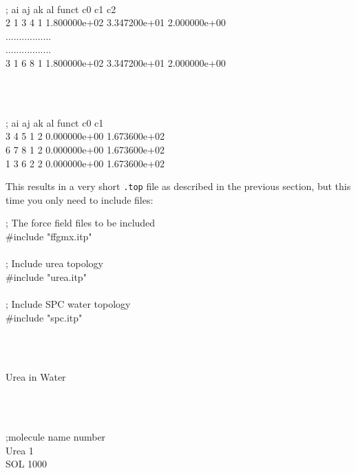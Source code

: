 \begin{tt}
[ dihedrals ]\\
;  ai    aj    ak    al funct           c0           c1           c2\\
    2     1     3     4     1 1.800000e+02 3.347200e+01 2.000000e+00 \\
     .................\\
     .................\\
    3     1     6     8     1 1.800000e+02 3.347200e+01 2.000000e+00 \\
\end{tt}\\
\begin{tt}
[ dihedrals ]\\
;  ai    aj    ak    al funct           c0           c1\\
    3     4     5     1     2 0.000000e+00 1.673600e+02 \\
    6     7     8     1     2 0.000000e+00 1.673600e+02 \\
    1     3     6     2     2 0.000000e+00 1.673600e+02 \\
\end{tt}

This results in a very short {\tt *.top} file as described in the
previous section, but this time you only need to include files:

\begin{tt}
; The force field files to be included\\
\#include "ffgmx.itp"\\
  \\      
; Include urea topology\\
\#include "urea.itp"\\
\\
; Include SPC water topology\\
\#include "spc.itp"\\
\end{tt}\\
\begin{tt}
[ system ]\\
Urea in Water\\
\end{tt}\\
\begin{tt}
[ molecules ]\\
;molecule name  number\\
Urea              1\\
SOL               1000\\
\end{tt}


